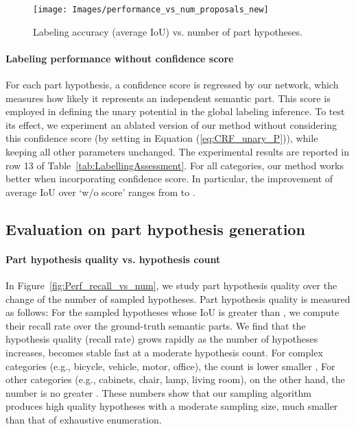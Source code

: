 \documentclass[acmtog]{acmart}
\newcommand{\new}[1]{{\color{black}#1}}
\begin{document}
\begin{figure}[!t]
  \centering
  \texttt{[image: Images/performance\_vs\_num\_proposals\_new]}
  \caption{\new{Labeling accuracy (average IoU) vs. number of part hypotheses.}}
  \label{fig:Performance_vs_num}
\end{figure}




\new{
\paragraph{\textbf{Labeling performance without confidence score}}
For each part hypothesis, a confidence score is regressed by our network, which measures
how likely it represents an independent semantic part.
This score is employed in defining the unary potential in the global labeling inference.
To test its effect,
we experiment an ablated version of our method without considering this confidence score
(by setting  in Equation (\ref{eq:CRF_unary_P})), while keeping all other parameters unchanged.
The experimental results are reported in row 13 of Table~\ref{tab:LabellingAssessment}.
For all categories, our method works better when incorporating confidence score.
In particular, the improvement of average IoU over `w/o score' ranges from  to .}











\subsection{Evaluation on part hypothesis generation}
\label{subsec:hypo}
\new{
\paragraph{\textbf{Part hypothesis quality vs. hypothesis count}}
In Figure~\ref{fig:Perf_recall_vs_num}, we study part hypothesis quality over the change of
the number of sampled hypotheses.
Part hypothesis quality is measured as follows:
For the sampled hypotheses whose IoU is greater than ,
we compute their recall rate over the ground-truth semantic parts.
We find that the hypothesis quality (recall rate) grows rapidly as the number of hypotheses increases,
becomes stable fast at a moderate hypothesis count.
For complex categories (e.g., bicycle, vehicle, motor, office), the count is lower smaller ,
For other categories (e.g., cabinets, chair, lamp, living room), on the other hand,
the number is no greater .
These numbers show that our sampling algorithm produces high quality hypotheses
with a moderate sampling size, much smaller than that of exhaustive enumeration.}   
\end{document}
